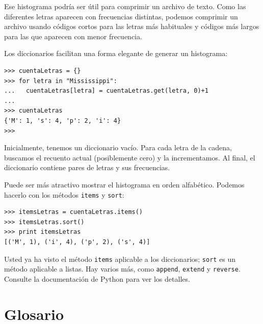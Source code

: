 Ese histograma podría ser útil para comprimir un archivo de texto. Como las diferentes letras aparecen con frecuencias distintas, podemos comprimir un archivo usando códigos cortos para las letras más habituales y códigos más largos para las que aparecen con menor frecuencia.

Los diccionarios facilitan una forma elegante de generar un histograma:

\beforeverb
\begin{verbatim}
>>> cuentaLetras = {}
>>> for letra in "Mississippi":
...   cuentaLetras[letra] = cuentaLetras.get(letra, 0)+1
...
>>> cuentaLetras
{'M': 1, 's': 4, 'p': 2, 'i': 4}
>>>
\end{verbatim}
\afterverb
%
Inicialmente, tenemos un diccionario vacío. Para cada letra de la cadena, buscamos el recuento actual (posiblemente cero) y la incrementamos. Al final, el diccionario contiene pares de letras y sus frecuencias.

Puede ser más atractivo mostrar el histograma en orden alfabético. Podemos hacerlo con los métodos \texttt{items} y \texttt{sort}:

\beforeverb
\begin{verbatim}
>>> itemsLetras = cuentaLetras.items()
>>> itemsLetras.sort()
>>> print itemsLetras
[('M', 1), ('i', 4), ('p', 2), ('s', 4)]
\end{verbatim}
\afterverb
%
Usted ya ha visto el método \texttt{items} aplicable a los diccionarios;  \texttt{sort} 
es un método aplicable a listas. Hay varios más, como \texttt{append}, \texttt{extend} 
y \texttt{reverse}. Consulte la documentación de Python para ver los detalles.



\section{Glosario}

